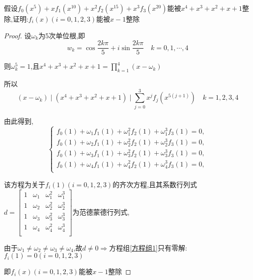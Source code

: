 \begin{example}\label{例题1.1.10}
    假设$f_0(x^5)+xf_1(x^{10})+x^2f_2(x^{15})+x^3f_3(x^{20})$能被$x^4+x^3+x^2+x+1$整除,证明:$f_i(x)(i=0,1,2,3)$能被$x-1$整除 
\end{example}

\begin{proof}
    
    设$\omega_k$为5次单位根,即
    \begin{equation*}
        w_k=\cos \frac{2k\pi}{5}+i\sin\frac{2k\pi}{5}\quad k=0,1,\cdots,4
    \end{equation*}

    则$\omega_k^5=1$,且$x^4+x^3+x^2+x+1=\prod \limits_{k=1}^{4}(x-\omega_k)$

    所以
    \begin{equation*}
        (x-\omega_k)\mid (x^4+x^3+x^2+x+1) \mid \sum\limits_{j=0}^{3}x^jf_j(x^{5(j+1)})\quad k=1,2,3,4
    \end{equation*}

    由此得到,
    \begin{equation}\label{方程组1}
        \begin{cases}
            f_0(1)+\omega_1f_1(1)+\omega_1^2f_2(1)+\omega_1^3f_3(1)=0,  \\ 
            f_0(1)+\omega_2f_1(1)+\omega_2^2f_2(1)+\omega_2^3f_3(1)=0,  \\ 
            f_0(1)+\omega_3f_1(1)+\omega_3^2f_2(1)+\omega_3^3f_3(1)=0,  \\ 
            f_0(1)+\omega_4f_1(1)+\omega_4^2f_2(1)+\omega_4^3f_3(1)=0,  \\ 
        \end{cases}
    \end{equation}

    该方程为关于$f_i(1)(i=0,1,2,3)$的齐次方程,且其系数行列式
    $       d=\begin{bmatrix}
            1 & \omega_1 & \omega_1^2 & \omega_1^3 \\ 
            1 & \omega_2 & \omega_2^2 & \omega_2^3 \\ 
            1 & \omega_3 & \omega_3^2 & \omega_3^3 \\ 
            1 & \omega_4 & \omega_4^2 & \omega_4^3 \\ 
            \end{bmatrix}$为范德蒙德行列式,

    由于$\omega_1\ne \omega_2 \ne \omega_3 \ne \omega_4$,故$d \ne 0\Longrightarrow$方程组\ref{方程组1}只有零解:$f_i(1)=0(i=0,1,2,3)$

    即$f_i(x)(i=0,1,2,3)$能被$x-1$整除 
\end{proof}

